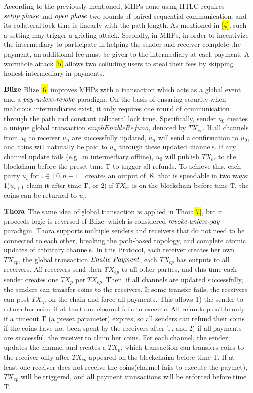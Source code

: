 \documentclass[conference]{IEEEtran}
\begin{document}
 According to the previously mentioned, MHPs done using HTLC requires $\emph{setup phase}$ and $\emph{open phase}$ two rounds of paired 
 sequential communication, and its collateral lock time is linearly with the path length. As mentioned in \colorbox{yellow}{[4]}, such a 
 setting may trigger a griefing attack. Secondly, in MHPs, in order to incentivize the intermediary to participate in helping the sender 
 and receiver complete the payment, an additional fee must be given to the intermediary at each payment. A wormhole attack \colorbox{yellow}{[5]} 
 allows two colluding users to steal their fees by skipping honest intermediary in payments.

 \noindent $\bf{Blize}$   Blize \colorbox{yellow}{[6]} improves MHPs with a transaction which acts as a global event and a $\emph{pay-unless-revoke}$ 
 paradigm. On the basis of ensuring security when malicious intermediaries exist, it only requires one round of communication through the 
 path and constant collateral lock time. Specifically, sender $u_0$ creates a unique global transaction $emph{Enable Refund}$, denoted 
 by $TX_{er}$. If all channels from $u_0$ to receiver $u_n$ are successfully updated, $u_n$ will send a confirmation to $u_0$, and coins 
 will naturally be paid to $u_n$ through these updated channels. If any channel update fails (e.g. an intermediary offline), $u_0$ will 
 publish $TX_{er}$ to the blockchain before the preset time T to trigger all refunds. To achieve this, each party $u_i$ for $i \in [0,n-1]$ 
 creates an output of $\aleph$ that is spendable in two ways: 1)$u_{i+1}$ claim it after time T, or 2) if $TX_{er}$ is on the blockchain 
 before time T, the coins can be returned to $u_i$.

 \noindent $\bf{Thora}$   The same idea of global transaction is applied in Thora\colorbox{yellow}{[7]}, but it proceeds logic is reversed of Blize, which is considered 
 $\emph{revoke-unless-pay}$ paradigm. Thora supports multiple senders and receivers that do not need to be connected to each other, 
 breaking the path-based topology, and complete atomic updates of arbitrary channels. In this Protocol, each receiver creates her own $TX_{ep}$, the global transaction $\emph{Enable Payment}$, 
 each $TX_{ep}$ has outputs to all receivers. All receivers send their $TX_{ep}$ to all other parties, and this time each sender creates 
 one $TX_p$ per $TX_{ep}$. Then, if all channels are updated successfully, the senders can transfer coins to the receivers. If some transfer 
 fails, the receivers can post $TX_{ep}$ on the chain and force all payments. This allows 1) the sender to return her coins if at least one 
 channel fails to execute. All refunds possible only if a timeout T (a preset parameter) expires, so all senders can refund 
 their coins if the coins have not been spent by the receivers after T, and 2) if all payments are successful, the receiver to claim her 
 coins. For each channel, the sender updates the channel and creates a $TX_p$, which transaction can transfers coins to the receiver 
 only after $TX_{ep}$ appeared on the blockchaina before time T. If at least one receiver does not receive the coins(channel fails to 
 execute the paymet), $TX_{ep}$ will be triggered, and all payment transactions will be enforced before time T.
\end{document}
